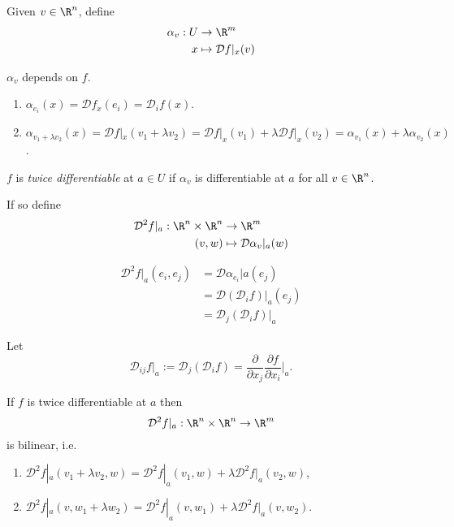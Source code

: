 \documentclass[a4paper]{article}
\newcommand*{\D}{\mathcal{D}}
\theoremstyle{definition}
\begin{document}
Given \(v \in \R^n\), define
\begin{align*}
  \alpha_v: U &\to \R^m \\
  x &\mapsto \D f|_x(v)
\end{align*}

\begin{note}
  \(\alpha_v\) depends on \(f\).
\end{note}

\begin{eg}\leavevmode
  \begin{enumerate}
  \item \(\alpha_{e_i}(x) = \D f_{x}(e_i) =\D_i f(x)\).
  \item \(\alpha_{v_1 + \lambda v_2}(x) = \D f|_x(v_1 + \lambda v_2) = \D f|_x(v_1) + \lambda \D f|_x(v_2) = \alpha_{v_1}(x) + \lambda \alpha_{v_2}(x)\).
  \end{enumerate}
\end{eg}

\begin{definition}
  \(f\) is \emph{twice differentiable} at \(a \in U\) if \(\alpha_v\) is differentiable at \(a\) for all \(v \in \R^n\).

  If so define
  \begin{align*}
    \D^2 f|_a: \R^n \times \R^n &\to \R^m \\
    (v, w) &\mapsto \D \alpha_v|_a (w)
  \end{align*}
\end{definition}

\begin{eg}
  \begin{align*}
    \D^2 f|_a (e_i, e_j) &= \D \alpha_{e_i}|a (e_j) \\
                         &= \D (\D_i f)|_a (e_j) \\
                         &= \D_j (\D_i f)|_a
  \end{align*}
\end{eg}

\begin{notation}
  Let
  \[
    \D_{ij} f|_a := \D_j (\D_i f) = \frac{\partial}{\partial x_j} \frac{\partial f}{\partial x_i} \Big|_a.
  \]
\end{notation}

\begin{lemma}
  If \(f\) is twice differentiable at \(a\) then
  \[
    \D^2 f|_a: \R^n \times \R^n \to \R^m
  \]
  is bilinear, i.e.
  \begin{enumerate}
  \item \(\D^2 f|_a(v_1 + \lambda v_2, w) = \D^2 f|_a(v_1, w) + \lambda \D^2 f|_a(v_2, w)\),
  \item \(\D^2 f|_a(v, w_1 + \lambda w_2) = \D^2 f|_a(v, w_1) + \lambda \D^2 f|_a(v, w_2)\).
  \end{enumerate}
\end{lemma}
\end{document}
